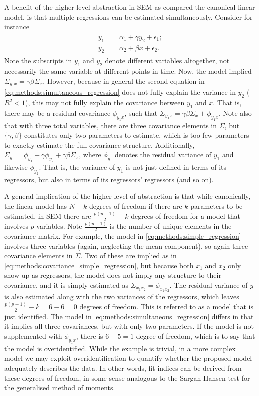 A benefit of the higher-level abstraction in SEM as compared the canonical linear model, is that multiple regressions
can be estimated simultaneously. Consider for instance
\begin{align}
\begin{split}
    \label{eq:methods:simultaneous_regression}
    y_1 &= \alpha_1 + \gamma y_2 + \epsilon_1;\\
    y_2 &= \alpha_2 + \beta x + \epsilon_2.
\end{split}
\end{align}
Note the subscripts in $y_1$ and $y_2$ denote different variables altogether,
not necessarily the same variable at different points in time.
Now, the model-implied $\Sigma_{y_1 x} = \gamma \beta \Sigma_x$.
However, because in general the second equation in \cref{eq:methods:simultaneous_regression} does not fully explain the
variance in $y_2$ ($R^2 < 1$), this may not fully explain the covariance between $y_1$ and $x$.
That is, there may be a residual covariance $\phi_{y_1 x}$, such that $\Sigma_{y_1 x} = \gamma \beta \Sigma_x + \phi_{y_1 x}$.
Note also that with three total variables, there are three covariance elements in $\Sigma$, but $\{\gamma, \beta\}$
constitutes only two parameters to estimate, which is too few parameters to exactly estimate the full covariance structure.
Additionally, $\Sigma_{y_1} = \phi_{y_1} + \gamma \phi_{y_2} + \gamma \beta \Sigma_x$, where
$\phi_{y_1}$ denotes the residual variance of $y_1$ and likewise $\phi_{y_2}$. That is, the variance of $y_1$ is not
just defined in terms of its regressors, but also in terms of its regressors' regressors (and so on).

A general implication of the higher level of abstraction is that while canonically, the linear model has $N - k$ degrees
of freedom if there are $k$ parameters to be estimated, in SEM there are $\frac{p(p+1)}{2} - k$ degrees of freedom
for a model that involves $p$ variables. Note $\frac{p(p+1)}{2}$ is the number of unique elements in the covariance matrix.
For example, the model in \cref{eq:methods:simple_regression} involves three variables (again, neglecting the mean component),
so again three covariance elements in $\Sigma$. Two of these are implied as in \cref{eq:methods:covariance_simple_regression},
but because both $x_1$ and $x_2$ only show up as regressors, the model does not imply any structure to their covariance,
and it is simply estimated as $\Sigma_{x_1 x_2} = \phi_{x_1 x_2}$. The residual variance of $y$ is also estimated along
with the two variances of the regressors, which leaves $\frac{p(p + 1)}{2} - k = 6 - 6 = 0$ degrees of freedom. This is
referred to as a model that is just identified.
The model in \cref{eq:methods:simultaneous_regression} differs in that it implies all three covariances, but with only two
parameters. If the model is not supplemented with $\phi_{y_1 x}$, there is $6 - 5 = 1$ degree of freedom, which is to
say that the model is overidentified.
While the example is trivial, in a more complex model we may exploit overidentification to quantify
whether the proposed model adequately describes the data. In other words, fit indices can be derived from these degrees
of freedom, in some sense analogous to the Sargan-Hansen test for the generalised method of moments.

